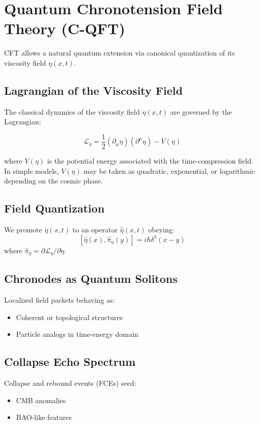 \documentclass[11pt]{article}
\begin{document}
\section{Quantum Chronotension Field Theory (C-QFT)}
CFT allows a natural quantum extension via canonical quantization of its viscosity field $\eta(x, t)$.

\subsection{Lagrangian of the Viscosity Field}

The classical dynamics of the viscosity field $\eta(x, t)$ are governed by the Lagrangian:

\[
\mathcal{L}_\eta = \frac{1}{2} (\partial_\mu \eta)(\partial^\mu \eta) - V(\eta)
\]

where $V(\eta)$ is the potential energy associated with the time-compression field. In simple models, $V(\eta)$ may be taken as quadratic, exponential, or logarithmic depending on the cosmic phase.

\subsection{Field Quantization}
We promote $\eta(x, t)$ to an operator $\hat{\eta}(x, t)$ obeying:
\[
[\hat{\eta}(x), \hat{\pi}_\eta(y)] = i\hbar \delta^3(x - y)
\]
where $\hat{\pi}_\eta = \partial \mathcal{L}_\eta / \partial \dot{\eta}$.

\subsection{Chronodes as Quantum Solitons}
Localized field packets behaving as:
\begin{itemize}
    \item Coherent or topological structures
    \item Particle analogs in time-energy domain
\end{itemize}

\subsection{Collapse Echo Spectrum}
Collapse and rebound events (FCEs) seed:
\begin{itemize}
    \item CMB anomalies
    \item BAO-like features
\end{itemize}
\end{document}
